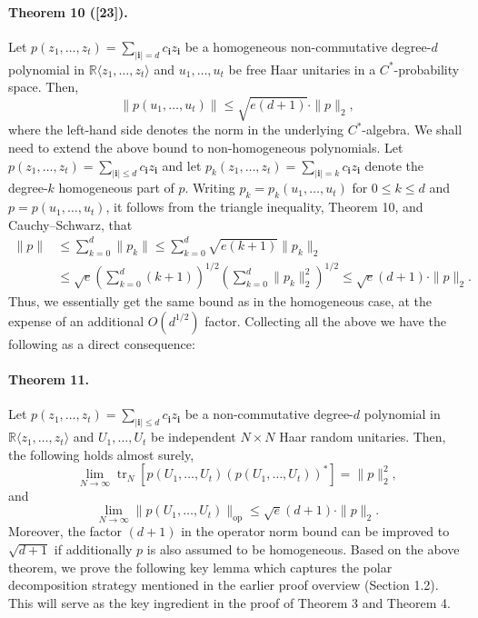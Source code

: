 \documentclass[10pt,a4paper]{article}
\begin{document}
\paragraph{Theorem 10 ([23]).}
Let $p(z_1,\ldots,z_t)=\sum_{|\mathbf i|=d}c_{\mathbf i}z_{\mathbf i}$ be a homogeneous non-commutative degree-$d$ polynomial in $\mathbb R\langle z_1,\ldots,z_t\rangle$ and $u_1,\ldots,u_t$ be free Haar unitaries in a $C^*$-probability space. Then,
\[\|p(u_1,\ldots,u_t)\|\leq\sqrt{e(d+1)}\cdot\|p\|_2,\]
where the left-hand side denotes the norm in the underlying $C^*$-algebra.
We shall need to extend the above bound to non-homogeneous polynomials. Let $p(z_1,\ldots,z_t)=\sum_{|\mathbf i|\leq d}c_{\mathbf i}z_{\mathbf i}$ and let $p_k(z_1,\ldots,z_t)=\sum_{|\mathbf i|=k}c_{\mathbf i}z_{\mathbf i}$ denote the degree-$k$ homogeneous part of $p$. Writing $p_k=p_k(u_1,\ldots,u_t)$ for $0\leq k\leq d$ and $p=p(u_1,\ldots,u_t)$, it follows from the triangle inequality, Theorem 10, and Cauchy--Schwarz, that
\begin{align*}
\|p\|&\leq\sum_{k=0}^d\|p_k\|\leq\sum_{k=0}^d\sqrt{e(k+1)}\|p_k\|_2\\
&\leq\sqrt e\left(\sum_{k=0}^d(k+1)\right)^{1/2}\left(\sum_{k=0}^d\|p_k\|_2^2\right)^{1/2}\leq\sqrt e(d+1)\cdot\|p\|_2.
\end{align*}
Thus, we essentially get the same bound as in the homogeneous case, at the expense of an additional $O(d^{1/2})$ factor.
Collecting all the above we have the following as a direct consequence:
\paragraph{Theorem 11.}
Let $p(z_1,\ldots,z_t)=\sum_{|\mathbf i|\leq d}c_{\mathbf i}z_{\mathbf i}$ be a non-commutative degree-$d$ polynomial in $\mathbb R\langle z_1,\ldots,z_t\rangle$ and $U_1,\ldots,U_t$ be independent $N\times N$ Haar random unitaries. Then, the following holds almost surely,
\[\lim_{N\to\infty}\operatorname{tr}_N[p(U_1,\ldots,U_t)(p(U_1,\ldots,U_t))^*]=\|p\|_2^2,\]
and
\[\lim_{N\to\infty}\|p(U_1,\ldots,U_t)\|_{\mathrm{op}}\leq\sqrt e(d+1)\cdot\|p\|_2.\]
Moreover, the factor $(d+1)$ in the operator norm bound can be improved to $\sqrt{d+1}$ if additionally $p$ is also assumed to be homogeneous.
Based on the above theorem, we prove the following key lemma which captures the polar decomposition strategy mentioned in the earlier proof overview (Section 1.2). This will serve as the key ingredient in the proof of Theorem 3 and Theorem 4.
\end{document}
